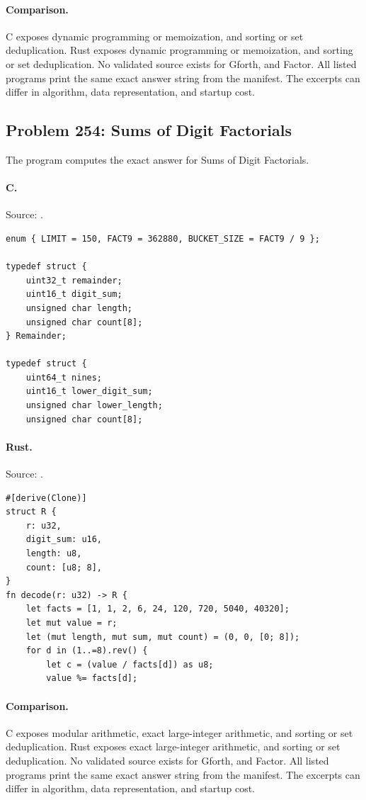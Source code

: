 \paragraph{Comparison.}
C exposes dynamic programming or memoization, and sorting or set deduplication. Rust exposes dynamic programming or memoization, and sorting or set deduplication.
No validated source exists for Gforth, and Factor.
All listed programs print the same exact answer string from the manifest. The excerpts can differ in algorithm, data representation, and startup cost.

\subsection{Problem 254: Sums of Digit Factorials}
\label{walkthrough:p254}
The program computes the exact answer for Sums of Digit Factorials.

\paragraph{C.} Source: .
\begin{lstlisting}
enum { LIMIT = 150, FACT9 = 362880, BUCKET_SIZE = FACT9 / 9 };

typedef struct {
    uint32_t remainder;
    uint16_t digit_sum;
    unsigned char length;
    unsigned char count[8];
} Remainder;

typedef struct {
    uint64_t nines;
    uint16_t lower_digit_sum;
    unsigned char lower_length;
    unsigned char count[8];
\end{lstlisting}

\paragraph{Rust.} Source: .
\begin{lstlisting}
#[derive(Clone)]
struct R {
    r: u32,
    digit_sum: u16,
    length: u8,
    count: [u8; 8],
}
fn decode(r: u32) -> R {
    let facts = [1, 1, 2, 6, 24, 120, 720, 5040, 40320];
    let mut value = r;
    let (mut length, mut sum, mut count) = (0, 0, [0; 8]);
    for d in (1..=8).rev() {
        let c = (value / facts[d]) as u8;
        value %= facts[d];
\end{lstlisting}

\paragraph{Comparison.}
C exposes modular arithmetic, exact large-integer arithmetic, and sorting or set deduplication. Rust exposes exact large-integer arithmetic, and sorting or set deduplication.
No validated source exists for Gforth, and Factor.
All listed programs print the same exact answer string from the manifest. The excerpts can differ in algorithm, data representation, and startup cost.


